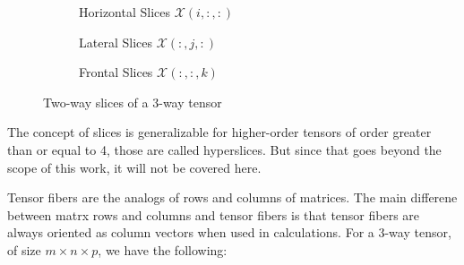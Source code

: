     \begin{figure}[ht]
        \def\distance{0.2}
        \def\m{2.5}
        \def\n{2}
        \def\p{1.5}
        \def\nslices{10}
        \def\rot{90}

        \centering
        
        \begin{subfigure}[b]{0.32\textwidth}
            \centering
            
            \caption[Horizontal Slices]{Horizontal Slices $\mathcal{X}(i, :, :)$}
            \label{fig:horizontal_slices}
        \end{subfigure}
        \hfill
        \begin{subfigure}[b]{0.32\textwidth}
            \centering
            
            \caption[Lateral Slices]{Lateral Slices $\mathcal{X}(:, j, :)$}
            \label{fig:lateral_slices}
        \end{subfigure}
        \hfill
        \begin{subfigure}[b]{0.32\textwidth}
            \def\nslices{6}
            \centering
            
            \caption[Frontal Slices]{Frontal Slices $\mathcal{X}(:, :, k)$}
            \label{fig:frontal_slices}
        \end{subfigure}

        \caption{Two-way slices of a 3-way tensor}
        \label{fig:slices}
    \end{figure}

    The concept of slices is generalizable for higher-order tensors of order
    greater than or equal to 4, those are called hyperslices. But since that
    goes beyond the scope of this work, it will not be covered here.

    Tensor fibers are the analogs of rows and columns of matrices. The main
    differene between matrx rows and columns and tensor fibers is that tensor
    fibers are always oriented as column vectors when used in calculations. For
    a 3-way tensor, of size $m\times n\times p$, we have the following:

